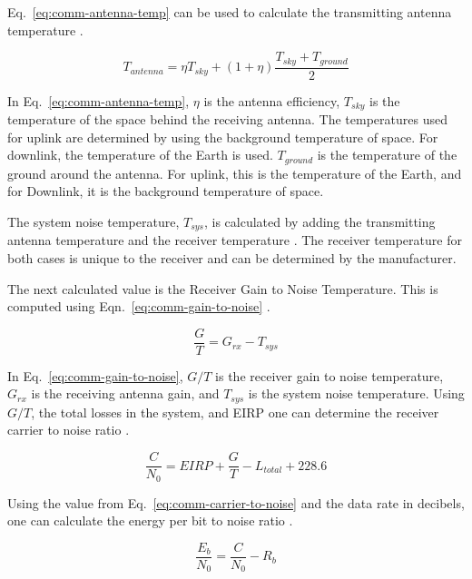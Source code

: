 \documentclass[12pt]{article}
\begin{document}
Eq.~\ref{eq:comm-antenna-temp} can be used to calculate the transmitting antenna temperature \cite{pozar}.

\begin{equation}\label{eq:comm-antenna-temp}
T_{antenna} = \eta T_{sky} + (1 + \eta) \frac{T_{sky} + T_{ground}}{2} 
\end{equation}

In Eq.~\ref{eq:comm-antenna-temp}, $\eta$ is the antenna efficiency, $T_{sky}$ is the temperature of the space behind the receiving antenna. The temperatures used for uplink are determined by using the background temperature of space. For downlink, the temperature of the Earth is used. $T_{ground}$ is the temperature of the ground around the antenna. For uplink, this is the temperature of the Earth, and for Downlink, it is the background temperature of space.

The system noise temperature, $T_{sys}$, is calculated by adding the transmitting antenna temperature and the receiver temperature \cite{pozar}. The receiver temperature for both cases is unique to the receiver and can be determined by the manufacturer.

The next calculated value is the Receiver Gain to Noise Temperature. This is computed using Eqn.~\ref{eq:comm-gain-to-noise} \cite[p.~477]{SMAD}.

\begin{equation}\label{eq:comm-gain-to-noise}
\frac{G}{T} =  G_{rx} - T_{sys} 
\end{equation}

In Eq.~\ref{eq:comm-gain-to-noise}, $G/T$ is the receiver gain to noise temperature, $G_{rx}$ is the receiving antenna gain, and $T_{sys}$ is the system noise temperature. Using $G/T$, the total losses in the system, and EIRP one can determine the receiver carrier to noise ratio \cite[p.~477]{SMAD}.

\begin{equation}\label{eq:comm-carrier-to-noise}
\frac{C}{N_0} = EIRP + \frac{G}{T} - L_{total} + 228.6 
\end{equation}

Using the value from Eq.~\ref{eq:comm-carrier-to-noise} and the data rate in decibels, one can calculate the energy per bit to noise ratio \cite[p.~478]{SMAD}.

\begin{equation}\label{eq:comm-energy-to-noise}
\frac{E_b}{N_0} = \frac{C}{N_0} - R_b 
\end{equation}
\end{document}
